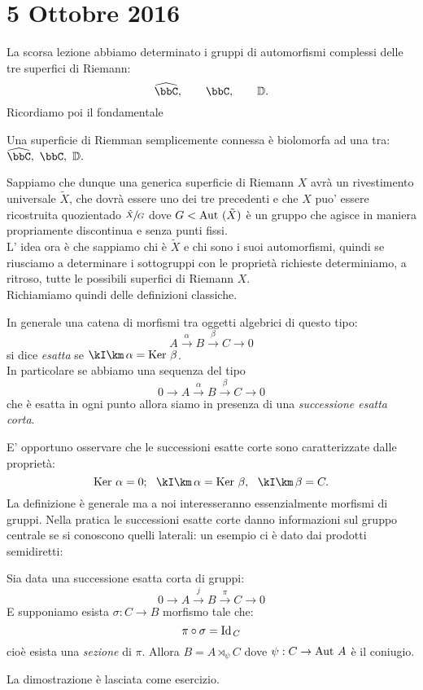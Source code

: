 \chapter{5 Ottobre 2016}
\justify
La scorsa lezione abbiamo determinato i gruppi di automorfismi complessi delle tre superfici di Riemann:
$$
\hat{\bbC},\qquad \bbC, \qquad \mathbb{D}.
$$
Ricordiamo poi il fondamentale
\begin{teorema}[Riemann] Una superficie di Riemman semplicemente connessa è biolomorfa ad una tra:
$\hat{\bbC},\ \bbC, \ \mathbb{D}. $
\end{teorema}
Sappiamo che dunque una generica superficie di Riemann $X$ avrà un rivestimento universale $\tilde{X}$, che dovrà essere uno dei tre precedenti e che $X$ puo' essere ricostruita quozientado $\sfrac{\tilde{X}}{G}$ dove $G<\text{Aut }(\tilde{X})$ è un gruppo che agisce in maniera propriamente discontinua e senza punti fissi.\\
L' idea ora è che sappiamo chi è $\tilde{X}$ e chi sono i suoi automorfismi, quindi se riusciamo a determinare i sottogruppi con le proprietà richieste determiniamo, a ritroso, tutte le possibili superfici di Riemann $X$.\\

Richiamiamo quindi delle definizioni classiche.

\begin{definizione} In generale una catena di morfismi tra oggetti algebrici di questo tipo:
$$
A\xrightarrow{\alpha}B\xrightarrow{\beta}C\rightarrow 0
$$
si dice {\it esatta} se $\Im{\alpha}=\Ker{\beta}$.\\
In particolare se abbiamo una sequenza del tipo
$$
0\rightarrow A\xrightarrow{\alpha}B\xrightarrow{\beta}C \rightarrow 0
$$ 
che è esatta in ogni punto allora siamo in presenza di una {\it successione esatta corta}.
\end{definizione}
E' opportuno osservare che le successioni esatte corte sono caratterizzate dalle proprietà:
$$
\Ker \alpha =0;\ \ \Im \alpha =\Ker \beta,\ \ \Im \beta =C.
$$
La definizione è generale ma a noi interesseranno essenzialmente morfismi di gruppi.
Nella pratica le successioni esatte corte danno informazioni sul gruppo centrale se si conoscono quelli laterali: un esempio ci è dato dai prodotti semidiretti:
\begin{fatto}
Sia data una successione esatta corta di gruppi:
$$
0\rightarrow A\xrightarrow{j}B\xrightarrow{\pi}C \rightarrow 0
$$
E supponiamo esista $\sigma:C\rightarrow B$ morfismo tale che:
$$
\pi\circ \sigma=\text{Id}_{\, C} 
$$
cioè esista  una {\it sezione} di $\pi$. Allora $B=A\rtimes_\psi C$ dove $\psi:C
\rightarrow \text{Aut } A$ è il coniugio.
\end{fatto}
La dimostrazione è lasciata come esercizio.

